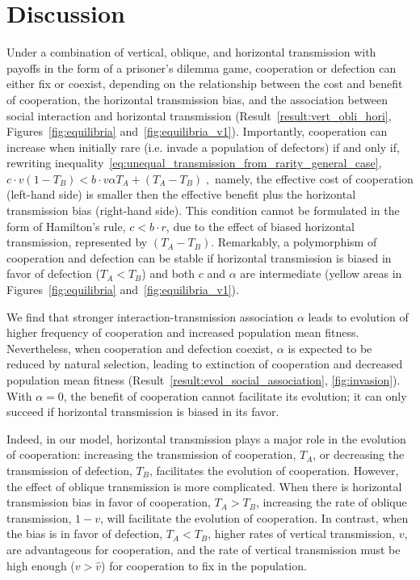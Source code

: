 \documentclass[12pt]{extarticle}
\begin{document}
\section{Discussion}
Under a combination of vertical, oblique, and horizontal transmission with payoffs in the form of a prisoner's dilemma game, cooperation or defection can either fix or coexist, depending on the relationship between the cost and benefit of cooperation, the horizontal transmission bias, and the association between social interaction and horizontal transmission (Result~\ref{result:vert_obli_hori}, Figures~\ref{fig:equilibria} and~\ref{fig:equilibria_v1}).
Importantly, cooperation can increase when initially rare (i.e. invade a population of defectors) if and only if, rewriting inequality~\ref{eq:unequal_transmission_from_rarity_general_case},
$
c \cdot v (1-T_B) < b \cdot v \alpha T_A + (T_A - T_B) \;,
$
namely, the effective cost of cooperation (left-hand side) is smaller then the effective benefit plus the horizontal transmission bias (right-hand side).
This condition cannot be formulated in the form of Hamilton's rule, $c<b \cdot r$, due to the effect of biased horizontal transmission, represented by $(T_A-T_B)$.
Remarkably, a polymorphism of cooperation and defection can be stable if horizontal transmission is biased in favor of defection ($T_A<T_B$) and both $c$ and $\alpha$ are intermediate (yellow areas in Figures~\ref{fig:equilibria} and~\ref{fig:equilibria_v1}).

We find that stronger interaction-transmission association $\alpha$ leads to evolution of higher frequency of cooperation and increased population mean fitness.
Nevertheless, when cooperation and defection coexist, $\alpha$ is expected to be reduced by natural selection, leading to extinction of cooperation and decreased population mean fitness (Result~\ref{result:evol_social_association}, \autoref{fig:invasion}).
With $\alpha=0$, the benefit of cooperation cannot facilitate its evolution; it can only succeed if horizontal transmission is biased in its favor. 

Indeed, in our model, horizontal transmission plays a major role in the evolution of cooperation: increasing the transmission of cooperation, $T_A$, or decreasing the transmission of defection, $T_B$, facilitates the evolution of cooperation. 
However, the effect of oblique transmission is more complicated.
When there is horizontal transmission bias in favor of cooperation, $T_A>T_B$, increasing the rate of oblique transmission, $1-v$, will facilitate the evolution of cooperation.
In contrast, when the bias is in favor of defection, $T_A<T_B$, higher rates of vertical transmission, $v$, are advantageous for cooperation, and the rate of vertical transmission must be high enough ($v>\hat v$) for cooperation to fix in the population.
\end{document}
